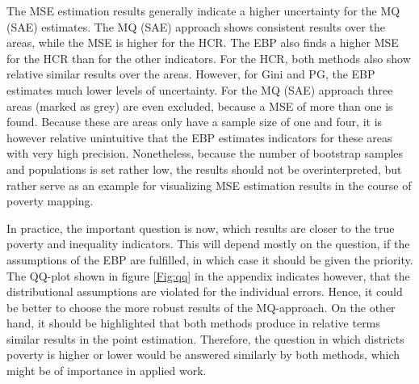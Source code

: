 The MSE estimation results generally indicate a higher uncertainty for the MQ (SAE) estimates. The MQ (SAE) approach shows consistent results over the areas, while the MSE is higher for the HCR. The EBP also finds a higher MSE for the  HCR than for the other indicators. For the HCR, both methods  also show relative similar results over the areas. However, for Gini and PG, the EBP estimates much lower levels of uncertainty. For the MQ (SAE) approach three areas (marked as grey) are even excluded, because a MSE of more than one is found.  Because these are areas only have a sample size of one and four,  it is however relative unintuitive that the EBP estimates indicators for these areas with very high precision.  Nonetheless, because the number of bootstrap samples and populations is set rather low,  the results should not be overinterpreted, but rather serve as an example for visualizing MSE estimation results in the course of poverty mapping. 


In practice, the important question is now, which results are closer to the true poverty and inequality indicators. This will depend mostly on the question, if the assumptions of the EBP are fulfilled, in which case it should be given the priority. The  QQ-plot shown in figure \ref{Fig:qq} in  the appendix indicates however, that the distributional assumptions are violated for the individual errors. Hence,  it could be better to choose the more robust results of the MQ-approach. 
On the other hand, it should be highlighted that both methods produce in relative terms similar results in the point estimation. Therefore, the question in which districts poverty is higher or lower would be answered similarly by both methods, which might be of importance in applied work. 

%


%
%



